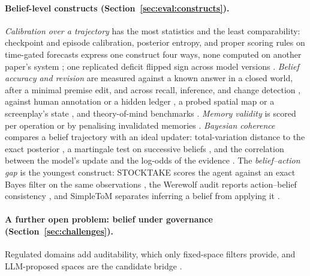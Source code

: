 \paragraph{Belief-level constructs (Section~\ref{sec:eval:constructs}).}
\emph{Calibration over a trajectory} has the most statistics and the least comparability: checkpoint and episode calibration, posterior entropy, and proper scoring rules on time-gated forecasts express one construct four ways, none computed on another paper's system \citep{lin2026uncertainty,singh2026agent,chattopadhayay2026belief,dixon2026belief,ghosh2026finbench,ye2026forecast}; one replicated deficit flipped sign across model versions \citep{joshi2026replication}. \emph{Belief accuracy and revision} are measured against a known answer in a closed world, after a minimal premise edit, and across recall, inference, and change detection \citep{xu2026should,dhanda2026deltalogic,nguyen2026dynamic}, against human annotation or a hidden ledger \citep{myakala2026beliefshift,chao2026stale,hao2026memops,yang2026groupmembench,srivastava2026constructing}, a probed spatial map or a screenplay's state \citep{zhang2026theory,tian2026stage}, and theory-of-mind benchmarks \citep{kim2023fantom,bawatneh2026omnitom,wang2026mindgames}. \emph{Memory validity} is scored per operation or by penalising invalidated memories \citep{chen2025halumem,wu2024longmemeval,liu2026worldmemarena,uddin2026recall}. \emph{Bayesian coherence} compares a belief trajectory with an ideal updater: total-variation distance to the exact posterior \citep{samanta2026bayesbench}, a martingale test on successive beliefs \citep{he2025martingale}, and the correlation between the model's update and the log-odds of the evidence \citep{imran2025are,yuan2025do}. The \emph{belief--action gap} is the youngest construct: STOCKTAKE scores the agent against an exact Bayes filter on the same observations \citep{deb2026stocktake}, the Werewolf audit reports action--belief consistency \citep{gao2026auditing}, and SimpleToM separates inferring a belief from applying it \citep{gu2024simpletom}.

\paragraph{A further open problem: belief under governance (Section~\ref{sec:challenges}).}
Regulated domains add auditability, which only fixed-space filters provide, and LLM-proposed spaces are the candidate bridge \citep{six2026learning,soru2026semantic,chen2026beliefcalibrated,dixon2026model}.
